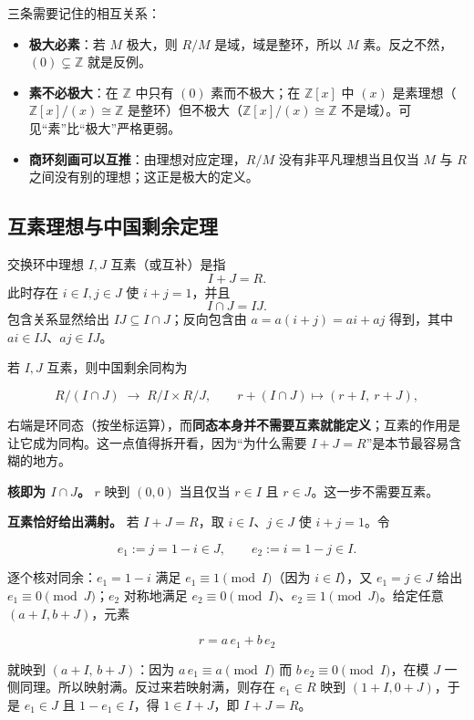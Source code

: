 三条需要记住的相互关系：

\begin{itemize}
\item \textbf{极大必素}：若 $M$ 极大，则 $R/M$ 是域，域是整环，所以 $M$ 素。反之不然，$(0)\subsetneq\mathbb Z$ 就是反例。
\item \textbf{素不必极大}：在 $\mathbb Z$ 中只有 $(0)$ 素而不极大；在 $\mathbb Z[x]$ 中 $(x)$ 是素理想（$\mathbb Z[x]/(x)\cong\mathbb Z$ 是整环）但不极大（$\mathbb Z[x]/(x)\cong\mathbb Z$ 不是域）。可见“素”比“极大”严格更弱。
\item \textbf{商环刻画可以互推}：由理想对应定理，$R/M$ 没有非平凡理想当且仅当 $M$ 与 $R$ 之间没有别的理想；这正是极大的定义。
\end{itemize}


\subsection{互素理想与中国剩余定理}


交换环中理想 $I,J$ 互素（或互补）是指
\[I+J=R.\]
此时存在 $i\in I,j\in J$ 使 $i+j=1$，并且
\[I\cap J=IJ.\]
包含关系显然给出 $IJ\subseteq I\cap J$；反向包含由 $a=a(i+j)=ai+aj$ 得到，其中 $ai\in IJ$、$aj\in IJ$。

若 $I,J$ 互素，则中国剩余同构为

\[
R/(I\cap J)\;\longrightarrow\;R/I\times R/J,\qquad r+(I\cap J)\longmapsto(r+I,\ r+J),
\]

右端是环同态（按坐标运算），而\textbf{同态本身并不需要互素就能定义}；互素的作用是让它成为同构。这一点值得拆开看，因为“为什么需要 $I+J=R$”是本节最容易含糊的地方。

\textbf{核即为 $I\cap J$。} $r$ 映到 $(0,0)$ 当且仅当 $r\in I$ 且 $r\in J$。这一步不需要互素。

\textbf{互素恰好给出满射。} 若 $I+J=R$，取 $i\in I$、$j\in J$ 使 $i+j=1$。令

\[
e_1:=j=1-i\in J,\qquad e_2:=i=1-j\in I .
\]

逐个核对同余：$e_1=1-i$ 满足 $e_1\equiv1\pmod I$（因为 $i\in I$），又 $e_1=j\in J$ 给出 $e_1\equiv0\pmod J$；$e_2$ 对称地满足 $e_2\equiv0\pmod I$、$e_2\equiv1\pmod J$。给定任意 $(a+I,b+J)$，元素

\[
r=a\,e_1+b\,e_2
\]

就映到 $(a+I,\,b+J)$：因为 $a\,e_1\equiv a\pmod I$ 而 $b\,e_2\equiv0\pmod I$，在模 $J$ 一侧同理。所以映射满。反过来若映射满，则存在 $e_1\in R$ 映到 $(1+I,0+J)$，于是 $e_1\in J$ 且 $1-e_1\in I$，得 $1\in I+J$，即 $I+J=R$。

